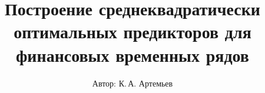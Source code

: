 \documentclass{beamer}
\title[]{Построение среднеквадратически оптимальных предикторов для финансовых временных рядов}
\author[К.\,А. Артемьев]{Автор: К.\,А. Артемьев}
\institute[]{Руководитель: Е.\,Р. Горяинова}
\begin{document}
	
	\begin{frame}
		\titlepage
	\end{frame}
	
\end{document}

